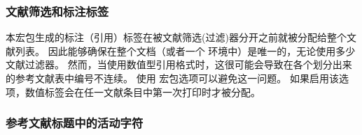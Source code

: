 \subsubsection{文献筛选和标注标签}%
\label{use:cav:lab}


本宏包生成的标注（引用）标签在被文献筛选(过滤)器分开之前就被分配给整个文献列表。
因此能够确保在整个文档（或者一个  环境中）是唯一的，无论使用多少文献过滤器。
然而，当使用数值型引用格式时，这很可能会导致在各个划分出来的参考文献表中编号不连续。
使用  宏包选项可以避免这一问题。
如果启用该选项，数值标签会在任一文献条目中第一次打印时才被分配。

\subsubsection{参考文献标题中的活动字符}%
\label{use:cav:act}


